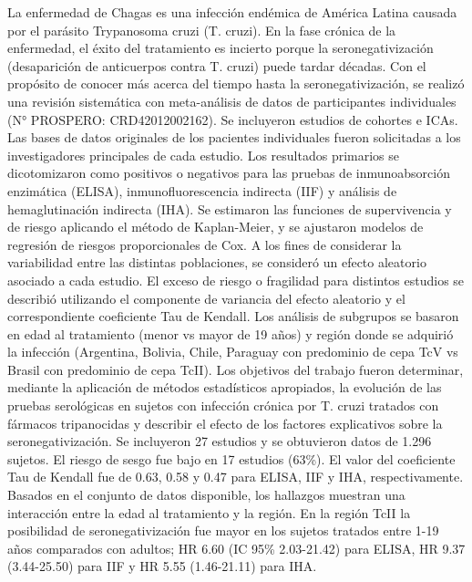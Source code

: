 {La enfermedad de Chagas es una infección endémica de América Latina causada por el parásito Trypanosoma cruzi (T. cruzi). En la fase crónica de la enfermedad, el éxito del tratamiento es incierto porque la seronegativización (desaparición de anticuerpos contra T. cruzi) puede tardar décadas. Con el propósito de conocer más acerca del tiempo hasta la seronegativización, se realizó una revisión sistemática con meta-análisis de datos de participantes individuales (N° PROSPERO: CRD42012002162). Se incluyeron estudios de cohortes e ICAs. Las bases de datos originales de los pacientes individuales fueron solicitadas a los investigadores principales de cada estudio. Los resultados primarios se dicotomizaron como positivos o negativos para las pruebas de inmunoabsorción enzimática (ELISA), inmunofluorescencia indirecta (IIF) y análisis de hemaglutinación indirecta (IHA). Se estimaron las funciones de supervivencia y de riesgo aplicando el método de Kaplan-Meier, y se ajustaron modelos de regresión de riesgos proporcionales de Cox. A los fines de considerar la variabilidad entre las distintas poblaciones, se consideró un efecto aleatorio asociado a cada estudio. El exceso de riesgo o fragilidad para distintos estudios se describió utilizando el componente de variancia del efecto aleatorio y el correspondiente coeficiente Tau de Kendall. Los análisis de subgrupos se basaron en edad al tratamiento (menor vs mayor de 19 años) y región donde se adquirió la infección (Argentina, Bolivia, Chile, Paraguay con predominio de cepa TcV vs Brasil con predominio de cepa TcII). Los objetivos del trabajo fueron determinar, mediante la aplicación de métodos estadísticos apropiados, la evolución de las pruebas serológicas en sujetos con infección crónica por T. cruzi tratados con fármacos tripanocidas y describir el efecto de los factores explicativos sobre la seronegativización. Se incluyeron 27 estudios y se obtuvieron datos de 1.296 sujetos. El riesgo de sesgo fue bajo en 17 estudios (63\%). El valor del coeficiente Tau de Kendall fue de 0.63, 0.58 y 0.47 para ELISA, IIF y IHA, respectivamente. Basados en el conjunto de datos disponible, los hallazgos muestran una interacción entre la edad al tratamiento y la región. En la región TcII la posibilidad de seronegativización fue mayor en los sujetos tratados entre 1-19 años comparados con adultos; HR 6.60 (IC 95\% 2.03-21.42) para ELISA, HR 9.37 (3.44-25.50) para IIF y HR 5.55 (1.46-21.11) para IHA.}
